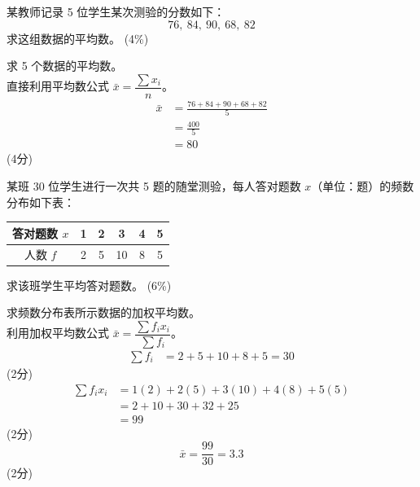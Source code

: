 \documentclass[12pt,a4paper]{exam-zh}
\begin{document}
\begin{question}[points = 4]
    某教师记录 5 位学生某次测验的分数如下：
    \[
        76,\ 84,\ 90,\ 68,\ 82
    \]
    求这组数据的平均数。
    \hfill (4\%)
\end{question}

\begin{solution}
    求 5 个数据的平均数。 \\
    直接利用平均数公式 $\bar{x}=\dfrac{\sum x_i}{n}$。
    \begin{align*}
        \bar{x} &= \frac{76+84+90+68+82}{5} \\
        &= \frac{400}{5} \\
        &= 80
    \end{align*}
    \hfill (4分)
\end{solution}

\begin{question}[points = 6]
    某班 30 位学生进行一次共 5 题的随堂测验，每人答对题数 $x$（单位：题）的频数分布如下表：

    \begin{center}
    \begin{tabular}{c|ccccc}
        答对题数 $x$ & 1 & 2 & 3 & 4 & 5 \\
        \hline
        人数 $f$ & 2 & 5 & 10 & 8 & 5
    \end{tabular}
    \end{center}

    求该班学生平均答对题数。
    \hfill (6\%)
\end{question}

\begin{solution}
    求频数分布表所示数据的加权平均数。 \\
    利用加权平均数公式 $\bar{x}=\dfrac{\sum f_ix_i}{\sum f_i}$。
    \begin{align*}
        \sum f_i &= 2+5+10+8+5 = 30
    \end{align*}
    \hfill (2分)
    \begin{align*}
        \sum f_ix_i &= 1(2)+2(5)+3(10)+4(8)+5(5) \\
        &= 2+10+30+32+25 \\
        &= 99
    \end{align*}
    \hfill (2分)
    \[
        \bar{x} = \frac{99}{30} = 3.3
    \]
    \hfill (2分)
\end{solution}
\end{document}
